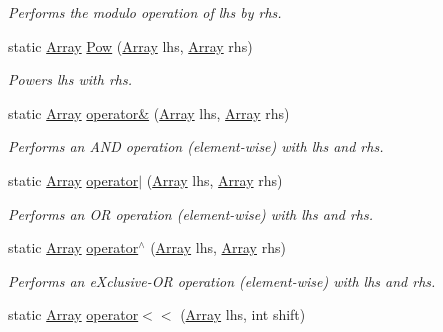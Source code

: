 \begin{DoxyCompactItemize}
\begin{DoxyCompactList}\small\item\em Performs the modulo operation of lhs by rhs. \end{DoxyCompactList}\item 
static \mbox{\hyperlink{classkhiva_1_1array_1_1_array}{Array}} \mbox{\hyperlink{classkhiva_1_1array_1_1_array_a1d73dc0fe824ffc5667f64b995c80bdc}{Pow}} (\mbox{\hyperlink{classkhiva_1_1array_1_1_array}{Array}} lhs, \mbox{\hyperlink{classkhiva_1_1array_1_1_array}{Array}} rhs)
\begin{DoxyCompactList}\small\item\em Powers lhs with rhs. \end{DoxyCompactList}\item 
static \mbox{\hyperlink{classkhiva_1_1array_1_1_array}{Array}} \mbox{\hyperlink{classkhiva_1_1array_1_1_array_a0f6a83bf6d269bbe810900ec48de4d8e}{operator\&}} (\mbox{\hyperlink{classkhiva_1_1array_1_1_array}{Array}} lhs, \mbox{\hyperlink{classkhiva_1_1array_1_1_array}{Array}} rhs)
\begin{DoxyCompactList}\small\item\em Performs an A\+ND operation (element-\/wise) with lhs and rhs. \end{DoxyCompactList}\item 
static \mbox{\hyperlink{classkhiva_1_1array_1_1_array}{Array}} \mbox{\hyperlink{classkhiva_1_1array_1_1_array_a9afedf82b778a5dd5e57e4a12c6df835}{operator$\vert$}} (\mbox{\hyperlink{classkhiva_1_1array_1_1_array}{Array}} lhs, \mbox{\hyperlink{classkhiva_1_1array_1_1_array}{Array}} rhs)
\begin{DoxyCompactList}\small\item\em Performs an OR operation (element-\/wise) with lhs and rhs. \end{DoxyCompactList}\item 
static \mbox{\hyperlink{classkhiva_1_1array_1_1_array}{Array}} \mbox{\hyperlink{classkhiva_1_1array_1_1_array_a9c14257fa56cce75b7c50132d2333bfb}{operator$^\wedge$}} (\mbox{\hyperlink{classkhiva_1_1array_1_1_array}{Array}} lhs, \mbox{\hyperlink{classkhiva_1_1array_1_1_array}{Array}} rhs)
\begin{DoxyCompactList}\small\item\em Performs an e\+Xclusive-\/\+OR operation (element-\/wise) with lhs and rhs. \end{DoxyCompactList}\item 
static \mbox{\hyperlink{classkhiva_1_1array_1_1_array}{Array}} \mbox{\hyperlink{classkhiva_1_1array_1_1_array_a13cb635c3e15fc0751e94009ad4f2570}{operator$<$$<$}} (\mbox{\hyperlink{classkhiva_1_1array_1_1_array}{Array}} lhs, int shift)

\end{DoxyCompactItemize}
